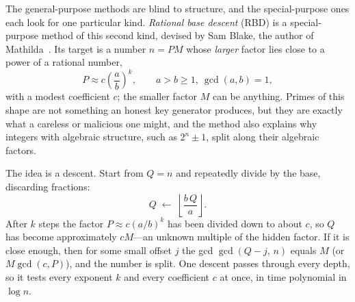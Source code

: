 The general-purpose methods are blind to structure, and the special-purpose ones each
look for one particular kind. \emph{Rational base descent}
(RBD) is a special-purpose method of this second kind, devised by Sam Blake, the author of
Mathilda~\cite{blake-rbd,blake-lattice-rbd}. Its target is a number \(n=PM\) whose
\emph{larger} factor lies close to a power of a rational number,
\[
  P \approx c\left(\frac{a}{b}\right)^{k},\qquad a>b\ge1,\ \gcd(a,b)=1,
\]
with a modest coefficient \(c\); the smaller factor \(M\) can be anything. Primes of this
shape are not something an honest key generator produces, but they are exactly what a
careless or malicious one might, and the method also explains why integers with
algebraic structure, such as \(2^{n}\pm1\), split along their algebraic factors.

The idea is a descent. Start from \(Q=n\) and repeatedly divide by the base, discarding
fractions:
\[
  Q \;\leftarrow\; \left\lfloor \frac{b\,Q}{a} \right\rfloor .
\]
After \(k\) steps the factor \(P\approx c(a/b)^{k}\) has been divided down to about \(c\),
so \(Q\) has become approximately \(cM\)---an unknown multiple of the hidden factor. If it
is close enough, then for some small offset \(j\) the gcd \(\gcd(Q-j,\,n)\) equals \(M\)
(or \(M\gcd(c,P)\)), and the number is split. One descent passes through every depth, so
it tests every exponent \(k\) and every coefficient \(c\) at once, in time polynomial in
\(\log n\).

\begin{codepairs}
\end{codepairs}

